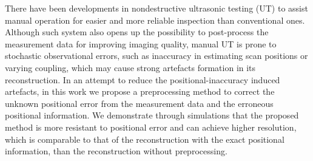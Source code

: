There have been developments in nondestructive ultrasonic testing (UT) to assist manual operation for easier and more reliable inspection than conventional ones. Although such system also opens up the possibility to post-process the measurement data for improving imaging quality, manual UT is prone to stochastic observational errors, such as inaccuracy in estimating scan positions or varying coupling, which may cause strong artefacts formation in its reconstruction. %
In an attempt to reduce the positional-inaccuracy induced artefacts, in this work we propose a preprocessing method to correct the unknown positional error from the measurement data and the erroneous positional information. %
We demonstrate through simulations that the proposed method is more resistant to positional error and can achieve higher resolution, which is comparable to that of the reconstruction with the exact positional information, than the reconstruction without preprocessing.